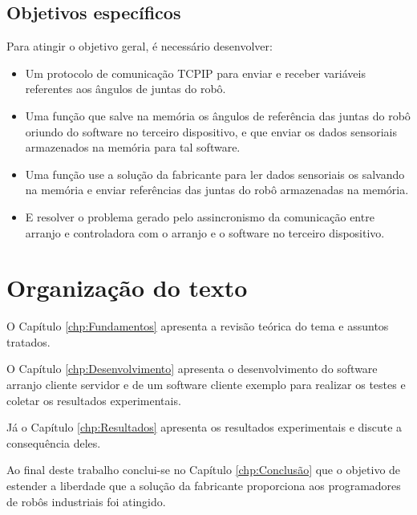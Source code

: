		\subsection{Objetivos específicos}
		    Para atingir o objetivo geral, é necessário desenvolver:
            \begin{itemize}
                \item Um protocolo de comunicação \ac{TCPIP} para enviar e receber variáveis referentes aos ângulos de juntas do robô.
                \item Uma função que salve na memória os ângulos de referência das juntas do robô oriundo do software no terceiro dispositivo, e que enviar os dados sensoriais armazenados na memória para tal software.
                \item Uma função use a solução da fabricante para ler dados sensoriais os salvando na memória e enviar referências das juntas do robô armazenadas na memória.
                \item E resolver o problema gerado pelo assincronismo da comunicação entre arranjo e controladora com o arranjo e o software no terceiro dispositivo.
            \end{itemize}
            
	\section{Organização do texto}  %
	    
	    O Capítulo \ref{chp:Fundamentos} apresenta a revisão teórica do tema e assuntos tratados.  %
	    
	    O Capítulo \ref{chp:Desenvolvimento} apresenta o desenvolvimento do software arranjo cliente servidor e de um software cliente exemplo para realizar os testes e coletar os resultados experimentais.
	    
	    Já o Capítulo \ref{chp:Resultados} apresenta os resultados experimentais e discute a consequência deles.
	    
	    Ao final deste trabalho conclui-se no Capítulo \ref{chp:Conclusão} que o objetivo de estender a liberdade que a solução da fabricante proporciona aos programadores de robôs industriais foi atingido.
